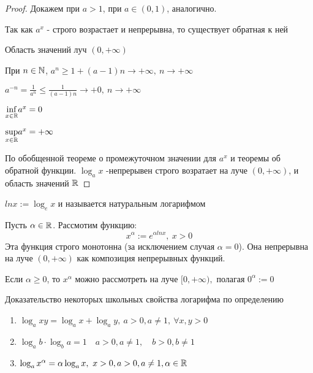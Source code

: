 \begin{proof}  
Докажем при $a > 1$, при $a \in (0, 1)$, аналогично.

Так как $a^x$ - строго возрастает и непрерывна, то существует обратная к ней

Область значений луч $(0, +\infty)$

При  $n \in \mathbb{N}$, $a^n \geq 1 + (a - 1)n \to + \infty, \ n \to + \infty$ 

$a^{-n} = \frac{1}{a^n} \leq \frac{1}{(a - 1)n} \to + 0, \ n \to + \infty$ 

$\underset{x \in \mathbb{R}}{\inf} a^x = 0$


$\underset{x \in \mathbb{R}}{\sup} a^x = + \infty$

По обобщенной теореме о промежуточном значении для $a^x$ и теоремы об обратной функции. $\log_a x$ -непрерывен строго возратает на луче $(0, +\infty)$, и область значений $\mathbb{R}$
\end{proof}

\begin{definition}
$ln x := \log_e x$ и называется натуральным логарифмом
\end{definition}

\begin{definition}
    Пусть $\alpha \in \mathbb{R}$. Рассмотим функцию:
    $$ x^{\alpha} := e^{\alpha ln x}, \ x> 0
    $$
    Эта функция строго монотонна (за исключением случая $\alpha = 0$). Она непрерывна на луче $(0, +\infty)$ как композиция непрерывных функций.
    
    Если $\alpha \geq 0$, то $x^{\alpha}$ можно рассмотреть на луче $[0, +\infty),$ полагая $0^{\alpha} := 0$
\end{definition}

\begin{theorem} 
Доказательство некоторых школьных свойства логарифма по определению
\begin{enumerate}
    \item $\log_a xy = \log_a x + \log_a y, \ a > 0, a \neq 1, \ \forall x,y > 0$
    \item $\log_{a} b \cdot \log_{b} a = 1 \quad a > 0, a \neq 1, \quad b> 0, b\neq 1$
    \item $\log_{a} x^{\alpha} = \alpha \log_{a} x, \ x > 0, a> 0, a\neq 1, \alpha \in \mathbb{R}$
\end{enumerate}
\end{theorem}

